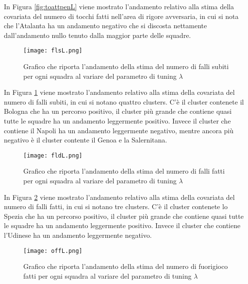 In Figura \ref{fig:toattpenL} viene mostrato l'andamento relativo alla stima della covariata del numero di tocchi fatti nell'area di rigore avversaria, in cui si nota che l'Atalanta ha un andamento negativo che si discosta nettamente dall'andamento nullo tenuto dalla maggior parte delle squadre.

\begin{figure}[htbp]
	\begin{center}
		\texttt{[image: flsL.png]}
		\caption{Grafico che riporta l'andamento della stima del numero di falli subiti per ogni squadra al variare del parametro di tuning $\lambda$} \label{fig:flsL}
	\end{center}
\end{figure}

In Figura \ref{fig:flsL} viene mostrato l'andamento relativo alla stima della covariata del numero di falli subiti, in cui si notano quattro clusters. C'è il cluster contenete il Bologna che ha un percorso positivo, il cluster più grande che contiene quasi tutte le squadre ha un andamento leggermente positivo. Invece il cluster che contiene il Napoli ha un andamento leggermente negativo, mentre ancora più negativo è il cluster contente il Genoa e la Salernitana.

\begin{figure}[htbp]
	\begin{center}
		\texttt{[image: fldL.png]}
		\caption{Grafico che riporta l'andamento della stima del numero di falli fatti per ogni squadra al variare del parametro di tuning $\lambda$} \label{fig:fldL}
	\end{center}
\end{figure}

In Figura \ref{fig:fldL} viene mostrato l'andamento relativo alla stima della covariata del numero di falli fatti, in cui si notano tre clusters. C'è il cluster contenete lo Spezia che ha un percorso positivo, il cluster più grande che contiene quasi tutte le squadre ha un andamento leggermente positivo. Invece il cluster che contiene l'Udinese ha un andamento leggermente negativo.

\begin{figure}[htbp]
	\begin{center}
		\texttt{[image: offL.png]}
		\caption{Grafico che riporta l'andamento della stima del numero di fuorigioco fatti per ogni squadra al variare del parametro di tuning $\lambda$} \label{fig:offL}
	\end{center}
\end{figure}


